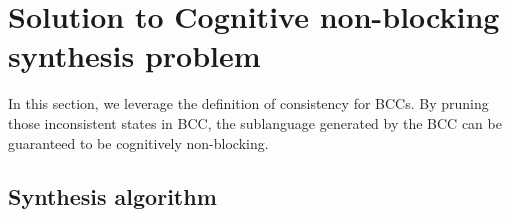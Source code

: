 \documentclass[final,5p,times,twocolumn,authoryear]{elsarticle}
\begin{document}
\section{Solution to Cognitive non-blocking synthesis problem}\label{sec:solu}
% 
% 
%

In this section, we leverage the definition of consistency for BCCs.
By pruning those inconsistent states in BCC, the sublanguage generated by the BCC can be guaranteed to be cognitively non-blocking.
%

\subsection{Synthesis algorithm}\label{subsec:supervisor_induction}
\end{document}

